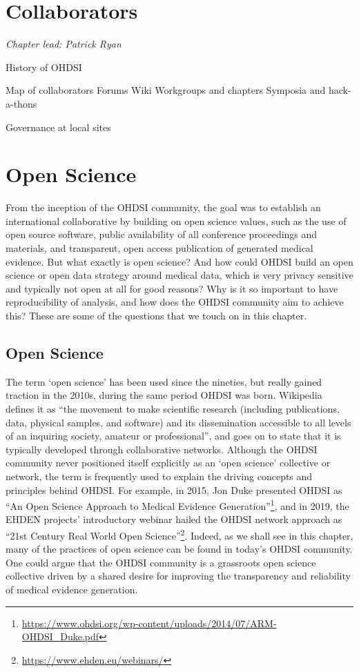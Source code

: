\documentclass[11pt]{book}
\let\rmarkdownfootnote\footnote%
\def\footnote{\protect\rmarkdownfootnote}
\theoremstyle{definition}
\theoremstyle{definition}
\theoremstyle{definition}
\theoremstyle{remark}
\begin{document}
\hypertarget{Collaborators}{%
\chapter{Collaborators}\label{Collaborators}}

\emph{Chapter lead: Patrick Ryan}

History of OHDSI

Map of collaborators
Forums
Wiki
Workgroups and chapters
Symposia and hack-a-thons

Governance at local sites

\hypertarget{OpenScience}{%
\chapter{Open Science}\label{OpenScience}}

From the inception of the OHDSI community, the goal was to establish an international collaborative by building on open science values, such as the use of open source software, public availability of all conference proceedings and materials, and transparent, open access publication of generated medical evidence. But what exactly is open science? And how could OHDSI build an open science or open data strategy around medical data, which is very privacy sensitive and typically not open at all for good reasons? Why is it so important to have reproducibility of analysis, and how does the OHDSI community aim to achieve this? These are some of the questions that we touch on in this chapter.

\hypertarget{open-science}{%
\section{Open Science}\label{open-science}}

The term `open science' has been used since the nineties, but really gained traction in the 2010s, during the same period OHDSI was born. Wikipedia \citep{wiki:Open_science} defines it as ``the movement to make scientific research (including publications, data, physical samples, and software) and its dissemination accessible to all levels of an inquiring society, amateur or professional'', and goes on to state that it is typically developed through collaborative networks. Although the OHDSI community never positioned itself explicitly as an `open science' collective or network, the term is frequently used to explain the driving concepts and principles behind OHDSI. For example, in 2015, Jon Duke presented OHDSI as ``An Open Science Approach to Medical Evidence Generation''\footnote{\url{https://www.ohdsi.org/wp-content/uploads/2014/07/ARM-OHDSI_Duke.pdf}}, and in 2019, the EHDEN projects' introductory webinar hailed the OHDSI network approach as ``21st Century Real World Open Science''\footnote{\url{https://www.ehden.eu/webinars/}}. Indeed, as we shall see in this chapter, many of the practices of open science can be found in today's OHDSI community. One could argue that the OHDSI community is a grassroots open science collective driven by a shared desire for improving the transparency and reliability of medical evidence generation.
\end{document}
